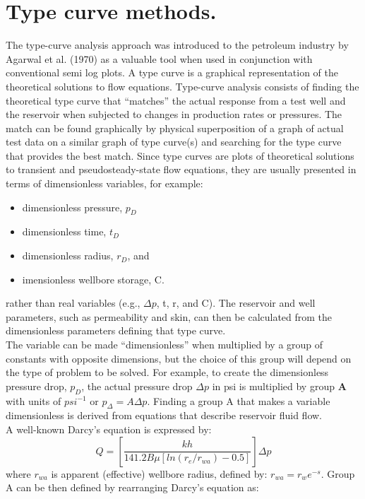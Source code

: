\documentclass[12pt,a4paper]{report}
\begin{document}
\section{Type curve methods.\cite{Tarek}}
The type-curve analysis approach was introduced to the petroleum industry by Agarwal et al. (1970) as a valuable tool when used in conjunction with conventional semi log plots. A type curve is a graphical representation of the theoretical solutions to flow equations. Type-curve analysis consists of finding the theoretical type curve that “matches” the actual response from a test well and the reservoir when subjected to changes in production rates or pressures. The match can be found graphically by physical superposition of a graph of actual test data on a similar graph of type curve(s) and searching for the type curve that provides the best match. Since type curves are plots of theoretical solutions to transient and pseudosteady-state flow equations, they are usually presented in terms of dimensionless variables, for example:
\begin{itemize}
	\item dimensionless pressure, $p_{D}$
	\item dimensionless time, $t_{D}$
	\item dimensionless radius, $r_{D}$, and
	\item imensionless wellbore storage, C.
\end{itemize}
rather than real variables (e.g., $\Delta p$, t, r, and C). The reservoir and well parameters, such as permeability and skin, can then be calculated from the dimensionless parameters defining that type curve.\\
The variable can be made “dimensionless” when multiplied by a group of constants with opposite dimensions, but the choice of this group will depend on the type of problem to be solved. For example, to create the dimensionless pressure drop, $p_{D}$, the actual pressure drop $\Delta p$ in psi is multiplied by group \textbf{A} with units of $psi^{-1}$ or $p_{\Delta} = A\Delta p$. Finding a group A that makes a variable dimensionless is derived from equations that describe reservoir fluid flow.\\
A well-known Darcy's equation is expressed by:
\begin{equation}
Q = [\frac{kh}{141.2B\mu [ln(r_{e}/r_{wa}) - 0.5]}]\Delta p
\end{equation}
where $r_{wa}$ is apparent (effective) wellbore radius, defined by: $r_{wa} = r_{w} e^{-s}$.
Group A can be then defined by rearranging Darcy's equation as:
\end{document}
